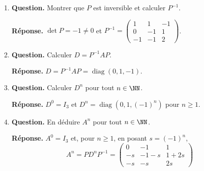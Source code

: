 \documentclass[12pt, a4paper]{article}
\begin{document}
\begin{enumerate}[label=4.\arabic*., start=60]
\begin{minipage}[t]{\linewidth}
\begin{enumerate}[\arabic*.]
        \item \textbf{Question.} Montrer que $P$ est inversible et calculer $P^{-1}$.
\par\smallskip
\textbf{Réponse.} $\det P=-1\neq0$ et $\displaystyle P^{-1}=\begin{pmatrix}1&1&-1\\0&-1&1\\-1&-1&2\end{pmatrix}$.

  \item \textbf{Question.} Calculer $D=P^{-1}AP$.
\par\smallskip
\textbf{Réponse.} $D=P^{-1}AP=\operatorname{diag}(0,1,-1)$.

  \item \textbf{Question.} Calculer $D^n$ pour tout $n\in\NN$.
\par\smallskip
\textbf{Réponse.} $D^0=I_3$ et $D^n=\operatorname{diag}(0,1,(-1)^n)$ pour $n\geq1$.

  \item \textbf{Question.} En déduire $A^n$ pour tout $n\in\NN$.
\par\smallskip
\textbf{Réponse.} $A^0=I_3$ et, pour $n\geq1$, en posant $s=(-1)^n$,
        \[
          A^n=PD^nP^{-1}=\begin{pmatrix}0&-1&1\\-s&-1-s&1+2s\\-s&-s&2s\end{pmatrix}
        \]

\end{enumerate}
\end{minipage}


\end{enumerate}
\end{document}
